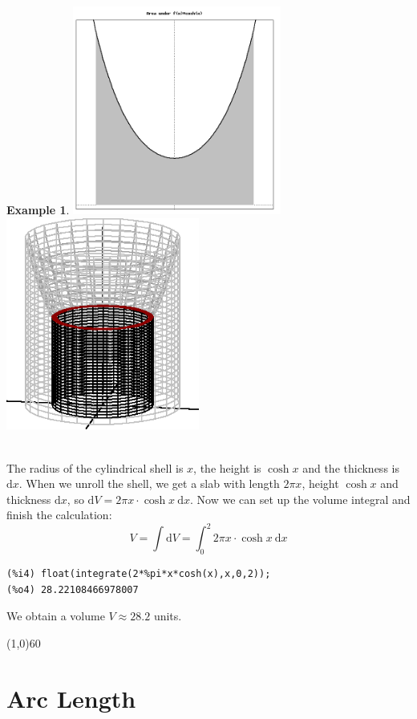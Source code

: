 \documentclass[10.5pt,twoside]{report}
\theoremstyle{definition}
\newtheorem{exmp}{Example}[section]
\begin{document}
\begin{exmp}
\includegraphics[width=2.7in]{example_3_2_4_1}
\includegraphics[width=2.5in]{example_3_2_4_2}

${}$\\
The radius of the cylindrical shell is $x$, the height is $\cosh{x}$ and the thickness is $\mathrm{d}x$.  When we unroll the shell, we get a slab with length $2\pi x$, height $\cosh{x}$ and thickness $\mathrm{d}x$, so $\mathrm{d}V=2\pi x\cdot \cosh{x}\ \mathrm{d}x$.  Now we can set up the volume integral and finish the calculation:\\

\[V=\int \mathrm{d}V = \int_0^2 2\pi x\cdot \cosh{x}\ \mathrm{d}x\]

\begin{verbatim}
(%i4) float(integrate(2*%pi*x*cosh(x),x,0,2));
(%o4) 28.22108466978007
\end{verbatim}

We obtain a volume $V\approx 28.2$ units.


\end{exmp}

\line(1,0){60}
\linethickness{0.5mm}
\pagebreak

\pagebreak
\section{Arc Length}\label{Arc Length}
\end{document}
